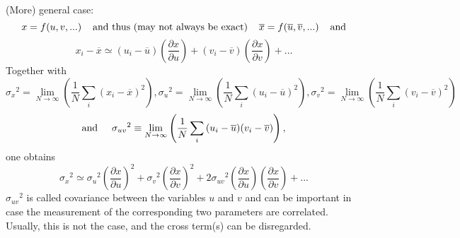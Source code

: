 \documentclass[12pt]{article}
\begin{document}
(More) general case:\\
\begin{displaymath}
x=f(u,v,...)
\hspace*{4mm}\mbox{and thus (may not always be exact)}\hspace*{4mm}
\overline{x}=f(\overline{u},\overline{v},...)\hspace*{4mm}\mbox{and}
\end{displaymath}
\begin{displaymath}
x_i-\overline{x}\simeq
(u_i-\overline{u})\left(\frac{\partial x}{\partial u}\right)+
(v_i-\overline{v})\left(\frac{\partial x}{\partial v}\right)+...
\end{displaymath}
Together with
\begin{displaymath}
{\sigma_x}^2= \lim_{N \rightarrow
  \infty}\left(\frac{1}{N}\sum_i{(x_i-\overline{x})^2}\right),
{\sigma_u}^2= \lim_{N \rightarrow
  \infty}\left(\frac{1}{N}\sum_i{(u_i-\overline{u})^2}\right),
{\sigma_v}^2= \lim_{N \rightarrow
  \infty}\left(\frac{1}{N}\sum_i{(v_i-\overline{v})^2}\right)
\end{displaymath}
\begin{displaymath}
\mbox{and}\hspace*{5mm} {\sigma_{uv}}^2\equiv \lim_{N \rightarrow
  \infty}\left(\frac{1}{N}\sum_i{(u_i-\overline{u})(v_i-\overline{v})}\right),
\end{displaymath}
one obtains
\begin{displaymath}
{\sigma_x}^2\simeq
{\sigma_u}^2\left(\frac{\partial x}{\partial u}\right)^2+
{\sigma_v}^2\left(\frac{\partial x}{\partial v}\right)^2+
2{\sigma_{uv}}^2\left(\frac{\partial x}{\partial u}\right)
\left(\frac{\partial x}{\partial v}\right)+...
\end{displaymath}
${\sigma_{uv}}^2$ is called covariance between the variables $u$ and $v$
and can be important in case the measurement of the corresponding two
parameters are correlated. Usually, this is not the case, and the cross
term(s) can be disregarded.
\end{document}
